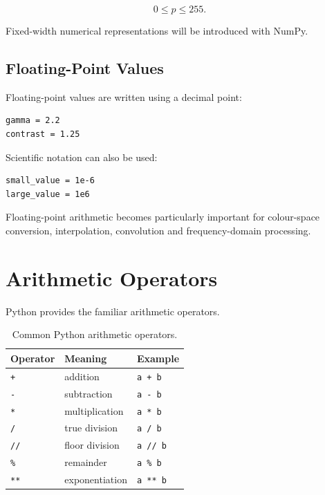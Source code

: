 \begin{equation}
0 \leq p \leq 255.
\end{equation}

Fixed-width numerical representations will be introduced with NumPy.


\subsection{Floating-Point Values}

Floating-point values are written using a decimal point:

\begin{verbatim}
gamma = 2.2
contrast = 1.25
\end{verbatim}

Scientific notation can also be used:

\begin{verbatim}
small_value = 1e-6
large_value = 1e6
\end{verbatim}

Floating-point arithmetic becomes particularly important for
colour-space conversion, interpolation, convolution and
frequency-domain processing.


\section{Arithmetic Operators}
\label{sec:python-arithmetic}

Python provides the familiar arithmetic operators.

\begin{table}[htbp]
    \centering

    \caption{Common Python arithmetic operators.}
    \label{tab:python-arithmetic}

    \begin{tabular}{@{}lll@{}}
        \toprule
        \textbf{Operator} &
        \textbf{Meaning} &
        \textbf{Example} \\
        \midrule

        \texttt{+}  & addition       & \texttt{a + b} \\
        \texttt{-}  & subtraction    & \texttt{a - b} \\
        \texttt{*}  & multiplication & \texttt{a * b} \\
        \texttt{/}  & true division  & \texttt{a / b} \\
        \texttt{//} & floor division & \texttt{a // b} \\
        \texttt{\%} & remainder      & \texttt{a \% b} \\
        \texttt{**} & exponentiation & \texttt{a ** b} \\

        \bottomrule
    \end{tabular}
\end{table}

